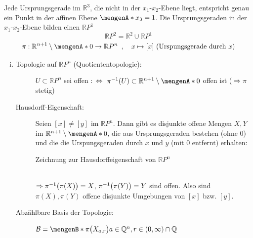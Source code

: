 Jede Ursprungsgerade im $\mathds{R}^3$, die nicht in der $x_1$-$x_2$-Ebene liegt, entspricht genau ein Punkt in der affinen Ebene $\set{x_3=1} $. Die Ursprungsgeraden in
der $x_1$-$x_2$-Ebene bilden einen $\mathds{R}P^1$
\[
	\mathds{R}P^2 = \mathds{R}^2 \cup \mathds{R}P^1
\]
\[
	\pi : \mathds{R}^{n+1} \setminus \set{0} \to \mathds{R}P^n \enspace, \quad x \mapsto [x] \text{ (Urspungsgerade durch $x$)} 
\]
\begin{enumerate}[(i)]
	\item \begin{description}
		\item[Topologie auf $\mathds{R}P^n$ (Quotiententopologie):]  $U \subset \mathds{R}P^n$ sei offen 
		$:\Leftrightarrow$ $\pi ^{-1} (U) \subset \mathds{R}^{n+1} \setminus \set{0} $ offen ist ($\Rightarrow \pi $ stetig)
		\item[Hausdorff-Eigenschaft:] Seien $[x] \not= [y]$ im $\mathds{R}P^n$. Dann gibt es disjunkte offene Mengen $X,Y$ im $\mathds{R}^{n+1} \setminus \set{0} $, die aus 
		Ursprungsgeraden bestehen (ohne $0$) und die die Urspungsgeraden durch $x$ und $y$ (mit $0$ entfernt) erhalten:\\
		\begin{minipage}{\textwidth}
			\captionsetup{type=figure, skip=3pt}
			\caption{Zeichnung zur Hausdorffeigenschaft von $\mathds{R}P^n$}
		\end{minipage}\smallskip\\
		$\Rightarrow \pi ^{-1} \enbrace[\big]{\pi ( X)} = X$, $\pi ^{-1} \enbrace[\big]{\pi (Y)} = Y$ sind offen. Also sind $\pi(X), \pi (Y)$ offene disjunkte Umgebungen von $[x]$ bzw. $[y]$.
		\item[Abzählbare Basis der Topologie:] $\mathcal{B} = \set[\pi \protect{\enbrace[\big]{X_{a,r}}}]{a \in \mathds{Q}^n, r \in (0,\infty)\cap \mathds{Q}}$ \smallskip\\
		\begin{minipage}{\textwidth}
			\captionsetup{type=figure, skip=3pt}
\end{minipage}
\end{description}
\end{enumerate}

